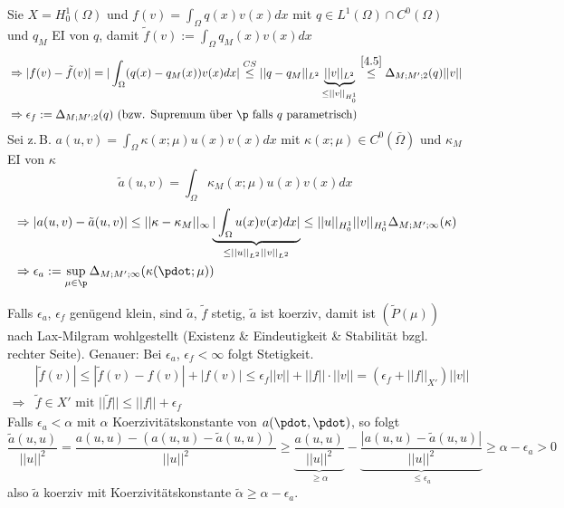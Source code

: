 \begin{bem}
Sie $X=H_0^1(\Omega)$ und $f(v) = \int_{\Omega} q(x) v(x) dx$ mit $q \in L^1(\Omega) \cap C^0(\Omega)$ und $q_M$ EI von $q$, damit $\tilde{f}(v) := \int_{\Omega} q_M(x)v(x) dx$
\begin{align*}
& \Rightarrow |f(v) - \tilde{f}(v)| = | \int_{\Omega} (q(x) - q_M(x)) v(x) dx | \overset{CS}{\leq} || q - q_M||_{L^2} \underbrace{||v||_{L^2}}_{\leq ||v||_{H_0^1}} \overset{\ref{4.5}}{\leq} \Delta_{M;M';2} (q) ||v|| \\
& \Rightarrow \epsilon_f := \Delta_{M;M';2} (q) \text{ (bzw. Supremum über } \p \text{ falls } q \text{ parametrisch)}
\end{align*}
Sei z.\,B. $a(u,v) = \int_{\Omega} \kappa(x;\mu) u(x) v(x) dx$ mit $\kappa(x;\mu) \in C^0(\bar{\Omega})$ und $\kappa_{M}$ EI von $\kappa$
\[
	\tilde{a}(u,v) = \int_{\Omega} \kappa_{M} (x;\mu) u(x) v(x) dx
\]
\begin{align*}
	& \Rightarrow |a(u,v) - \tilde{a}(u,v) | \leq || \kappa - \kappa_{M}||_{\infty} \underbrace{|\int_{\Omega} u(x) v(x) dx|}_{\leq ||u||_{L^2} ||v||_{L^2}} \leq || u||_{H_0^1} ||v||_{H_0^1} \Delta_{M;M';\infty} (\kappa) \\
	& \Rightarrow \epsilon_a := \sup\limits_{\mu \in \p} \Delta_{M;M';\infty} (\kappa(\pdot;\mu))
\end{align*}
\end{bem}

\begin{bem}
Falls $\epsilon_a$, $\epsilon_f$ genügend klein, sind $\tilde{a}$, $\tilde{f}$ stetig, $\tilde{a}$ ist koerziv, damit ist $(\tilde{P}(\mu))$ nach Lax-Milgram wohlgestellt (Existenz \& Eindeutigkeit \& Stabilität bzgl. rechter Seite). Genauer: Bei $\epsilon_a$, $\epsilon_f < \infty$ folgt Stetigkeit.
\begin{align*}
 &|\tilde{f}(v)| \leq |\tilde{f}(v) - f(v) | + |f(v)| \leq \epsilon_f ||v|| + ||f|| \cdot ||v|| = (\epsilon_f + ||f||_{X'}) ||v|| \\
 \Rightarrow &\tilde{f} \in X' \text{ mit } ||\tilde{f}|| \leq ||f|| + \epsilon_f
\end{align*}
Falls $\epsilon_a < \alpha$ mit $\alpha$ Koerzivitätskonstante von $a(\pdot,\pdot)$, so folgt
\[
	\frac{\tilde{a}(u,u)}{||u||^2} = \frac{a(u,u)-(a(u,u) - \tilde{a}(u,u))}{||u||^2} \geq \underbrace{\frac{a(u,u)}{||u||^2}}_{\geq \alpha} - \underbrace{\frac{|a(u,u) - \tilde{a}(u,u)|}{||u||^2}}_{\leq \epsilon_a} \geq \alpha - \epsilon_a > 0
\]
also $\tilde{a}$ koerziv mit Koerzivitätskonstante $\tilde{\alpha} \geq \alpha - \epsilon_a$.
\end{bem}

